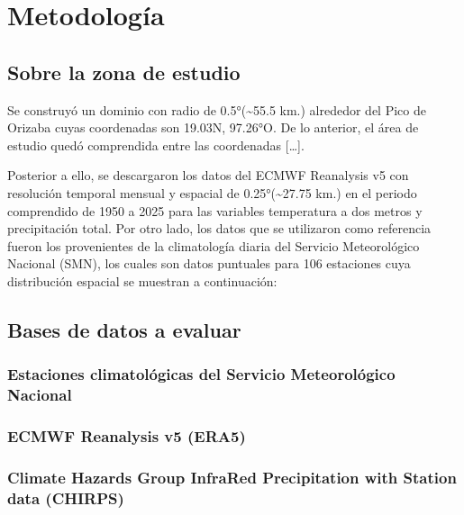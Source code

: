 \documentclass[
  spanish,
  letterpaper,
  DIV=11,
  numbers=noendperiod]{scrartcl}
\begin{document}
\section{Metodología}\label{metodologuxeda}

\subsection{Sobre la zona de estudio}\label{sobre-la-zona-de-estudio}

Se construyó un dominio con radio de 0.5°(\textasciitilde55.5 km.)
alrededor del Pico de Orizaba cuyas coordenadas son 19.03N, 97.26°O. De
lo anterior, el área de estudio quedó comprendida entre las coordenadas
{[}\ldots{]}.

Posterior a ello, se descargaron los datos del ECMWF Reanalysis v5 con
resolución temporal mensual y espacial de 0.25°(\textasciitilde27.75
km.) en el periodo comprendido de 1950 a 2025 para las variables
temperatura a dos metros y precipitación total. Por otro lado, los datos
que se utilizaron como referencia fueron los provenientes de la
climatología diaria del Servicio Meteorológico Nacional (SMN), los
cuales son datos puntuales para 106 estaciones cuya distribución
espacial se muestran a continuación:

\subsection{Bases de datos a evaluar}\label{bases-de-datos-a-evaluar}

\subsubsection{Estaciones climatológicas del Servicio Meteorológico
Nacional}\label{estaciones-climatoluxf3gicas-del-servicio-meteoroluxf3gico-nacional}

\subsubsection{ECMWF Reanalysis v5
(ERA5)}\label{ecmwf-reanalysis-v5-era5}

\subsubsection{Climate Hazards Group InfraRed Precipitation with Station
data
(CHIRPS)}\label{climate-hazards-group-infrared-precipitation-with-station-data-chirps}
\end{document}

